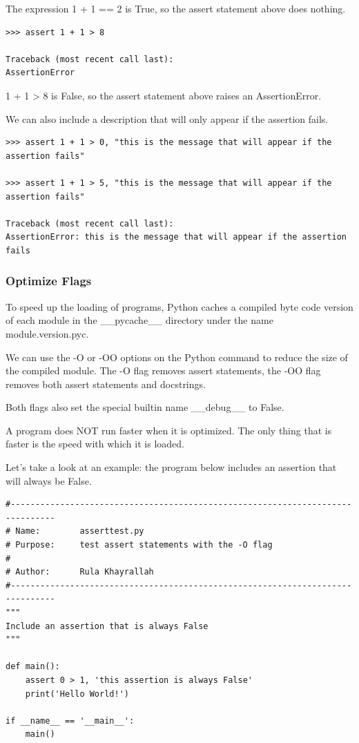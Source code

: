 \documentclass{article}
\begin{document}
The expression 1 + 1 == 2 is True, so the assert statement above does nothing.

\begin{lstlisting}
>>> assert 1 + 1 > 8

Traceback (most recent call last):
AssertionError
\end{lstlisting}

1 + 1 > 8 is False,  so the assert statement above raises an AssertionError.

We can also include a description that will only appear if the assertion fails.

\begin{lstlisting}
>>> assert 1 + 1 > 0, "this is the message that will appear if the assertion fails"

>>> assert 1 + 1 > 5, "this is the message that will appear if the assertion fails"

Traceback (most recent call last):
AssertionError: this is the message that will appear if the assertion fails
\end{lstlisting}
\subsubsection{Optimize Flags}

To speed up the loading of programs, Python caches a compiled byte code version of each module in the {\_}{\_}pycache{\_}{\_} directory under the name module.version.pyc.

We can use the -O or -OO options on the Python command to reduce the size of the compiled module. The -O flag removes assert statements, the -OO flag removes both assert statements and docstrings.   

Both flags also set the special builtin name {\_}{\_}debug{\_}{\_} to False.

A program does NOT run faster when it is optimized. The only thing that is faster is the speed with which it is loaded.

Let's take a look at an example:  the program below includes an assertion that will always be False.

\begin{lstlisting}
#-------------------------------------------------------------------------------
# Name:        asserttest.py
# Purpose:     test assert statements with the -O flag
#
# Author:      Rula Khayrallah
#-------------------------------------------------------------------------------
"""
Include an assertion that is always False
"""
 
def main():
    assert 0 > 1, 'this assertion is always False'
    print('Hello World!')
 
if __name__ == '__main__':
    main()
\end{lstlisting}
\end{document}
